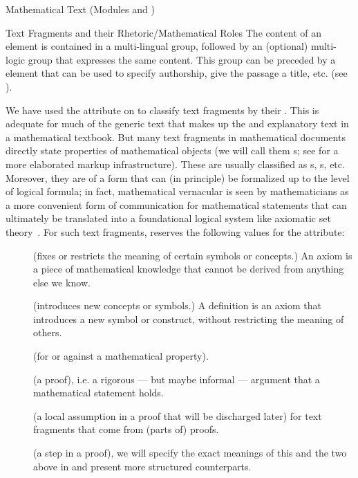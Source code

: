 \begin{tchapter}[id=mtxt,short=Mathematical Text]{Mathematical Text (Modules
   and )}
\begin{tsection}[id=omtext]{Text Fragments and their Rhetoric/Mathematical Roles}
  The content of an  element is 
  contained in a multi-lingual  group, followed by an (optional)
  multi-logic  group that expresses the same content.  This
   group can be preceded by a  element that can be used
  to specify authorship, give the passage a title, etc. (see ).

  We have used the  attribute on  to classify
  text fragments by their . This is adequate for much of the
  generic text that makes up the  and explanatory text in a
  mathematical textbook. But many text fragments in mathematical documents directly state
  properties of mathematical objects (we will call them
  {s}; see {} for a more elaborated
  markup infrastructure). These are usually classified as {s},
  {s}, etc.  Moreover, they are of a form that can (in principle) be
  formalized up to the level of logical formula; in fact, mathematical vernacular is seen
  by mathematicians as a more convenient form of communication for mathematical statements
  that can ultimately be translated into a foundational logical system like axiomatic set
  theory~\cite{Bernays:ast91}.  For such text fragments, \omdoc reserves the following
  values for the  attribute:
\begin{description}
\item[] (fixes or restricts the meaning of certain
  symbols or concepts.) An axiom is a piece of mathematical knowledge that cannot
  be derived from anything else we know.
\item[] (introduces new concepts or symbols.) A
  definition is an axiom that introduces a new symbol or construct, without restricting
  the meaning of others.
\item[] (for or against a mathematical property).
\item[] (a proof), i.e. a rigorous --- but maybe informal
  --- argument that a mathematical statement holds.
\item[] (a local assumption in a proof that will be
  discharged later) for text fragments that come from (parts of) proofs.
\item[] (a step in a proof), we will specify the exact
  meanings of this and the two above in  and present more structured
  counterparts.
\end{description} 


\end{tsection}
\end{tchapter}
